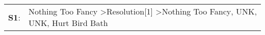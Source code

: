 \begin{supertabular}{p{0.03\textwidth}p{0.92\textwidth}}
 \textbf{S1}:  &  Nothing Too Fancy\textsuperscript{} \textgreater \enspace Resolution[1]\textsuperscript{} \textgreater \enspace Nothing Too Fancy\textsuperscript{}, \enspace UNK\textsuperscript{}, \enspace UNK\textsuperscript{}, \enspace Hurt Bird Bath\textsuperscript{}  \enspace  \\
\end{supertabular}
